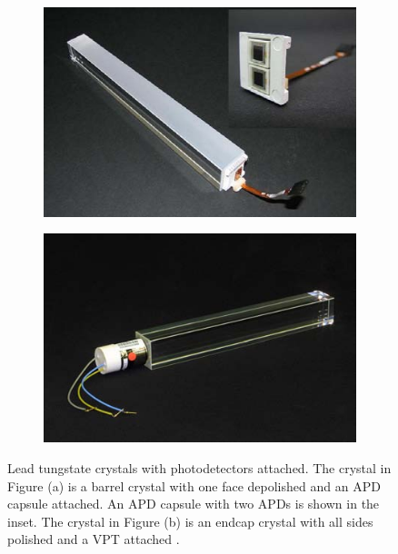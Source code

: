\begin{figure}
  \centering
  \begin{subfigure}[b]{0.49\textwidth}
    \includegraphics[width=\textwidth]{tex/cms/fig/ecal-crystal-eb.jpg}
    \caption{}
    \label{fig:ecal-crystal-eb}
  \end{subfigure}
  \begin{subfigure}[b]{0.49\textwidth}
    \includegraphics[width=\textwidth]{tex/cms/fig/ecal-crystal-ee.jpg}
    \caption{}
    \label{fig:ecal-crystal-ee}
  \end{subfigure}
  \caption{
    Lead tungstate crystals with photodetectors attached.  The crystal in Figure (a) 
    is a barrel crystal with one face depolished and an APD capsule attached.  
    An APD capsule with two APDs is shown in the inset.
    The crystal in Figure (b) is an endcap crystal with all sides polished and a VPT
    attached \cite{cms-jinst}.
  }
  \label{fig:ecal-crystal}
\end{figure}

